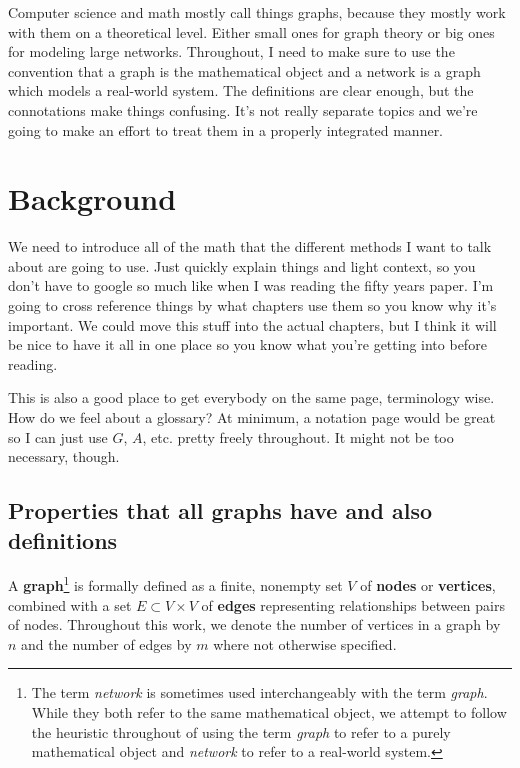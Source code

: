 \documentclass[12pt]{thesis}
\theoremstyle{plain}
\theoremstyle{definition}
\theoremstyle{remark}
\begin{document}
Computer science and math mostly call things graphs, because they mostly work with them on a theoretical level. Either small ones for graph theory or big ones for modeling large networks. Throughout, I need to make sure to use the convention that a graph is the mathematical object and a network is a graph which models a real-world system. The definitions are clear enough, but the connotations make things confusing. It's not really separate topics and we're going to make an effort to treat them in a properly integrated manner.
	

\chapter{Background}

We need to introduce all of the math that the different methods I want to talk about are going to use. Just quickly explain things and light context, so you don't have to google so much like when I was reading the fifty years paper. I'm going to cross reference things by what chapters use them so you know why it's important. We could move this stuff into the actual chapters, but I think it will be nice to have it all in one place so you know what you're getting into before reading.

This is also a good place to get everybody on the same page, terminology wise. How do we feel about a glossary? At minimum, a notation page would be great so I can just use $G$, $A$, etc. pretty freely throughout. It might not be too necessary, though.

\section{Properties that all graphs have and also definitions}

A \textbf{graph}\footnote{The term \textit{network} is sometimes used interchangeably with the term \textit{graph}. While they both refer to the same mathematical object, we attempt to follow the heuristic throughout of using the term \textit{graph} to refer to a purely mathematical object and \textit{network} to refer to a real-world system.} is formally defined as a finite, nonempty set $V$ of \textbf{nodes} or \textbf{vertices}, combined with a set $E\subset V\times V$ of \textbf{edges} representing relationships between pairs of nodes. Throughout this work, we denote the number of vertices in a graph by $n$ and the number of edges by $m$ where not otherwise specified.
\end{document}
